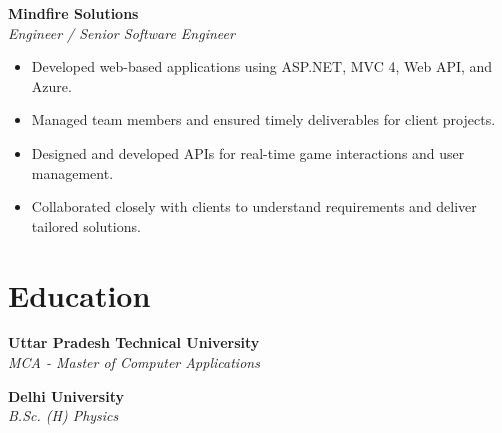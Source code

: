 \begin{tcolorbox}
\begin{minipage}[t]{0.7\textwidth}
\begin{tcolorbox}[grow to right by=0.75cm, height=0.8\textheight, colframe=white, colback=white]
                \vspace{1 em}
                \textbf{Mindfire Solutions} \hfill {} \\
                \textit{Engineer / Senior Software Engineer}  
                \begin{itemize}
                    \item Developed web-based applications using ASP.NET, MVC 4, Web API, and Azure.
                    \item Managed team members and ensured timely deliverables for client projects.
                    \item Designed and developed APIs for real-time game interactions and user management.
                    \item Collaborated closely with clients to understand requirements and deliver tailored solutions.
                \end{itemize}

                \section*{Education}

                \noindent
                \textbf{Uttar Pradesh Technical University} \\
                \textit{MCA - Master of Computer Applications} \hfill
                 \\

                          
                \vspace{.5em}
                
                \noindent
                \textbf{Delhi University} \\
                \textit{B.Sc. (H) Physics} \hfill
                 \\

            \end{tcolorbox}
        \end{minipage}
    \end{tcolorbox}
    

